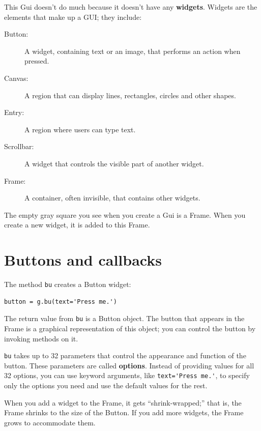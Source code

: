 \documentclass[10pt]{book}
\begin{document}
\begin{CJK}{UTF8}{gbsn}
This Gui doesn't do much because it doesn't have any
{\bf widgets}.  Widgets are the elements that make up a
GUI; they include:

\begin{description}

\item[Button:] A widget, containing text or an image, that
performs an action when pressed.

\item[Canvas:] A region that can display lines, rectangles,
circles and other shapes.

\item[Entry:] A region where users can type text.

\item[Scrollbar:] A widget that controls the visible part of another
widget.

\item[Frame:] A container, often invisible, that contains other
widgets.

\end{description}

The empty gray square you see when you create a Gui is
a Frame.  When you create a new widget, it is added to this Frame.



\section{Buttons and callbacks}

The method {\tt bu} creates a Button widget:

\begin{verbatim}
button = g.bu(text='Press me.')
\end{verbatim}
%
The return value from {\tt bu} is a Button object.  The button
that appears in the Frame is a graphical representation of this
object; you can control the button by invoking methods on it.

{\tt bu} takes up to 32 parameters that control the appearance
and function of the button.  These parameters are called
{\bf options}.  Instead of providing values for all 32 options,
you can use keyword arguments, like \verb"text='Press me.'",
to specify only the options you need and use the default
values for the rest.

When you add a widget to the Frame, it gets ``shrink-wrapped;''
that is, the Frame shrinks to the size of the Button.  If you
add more widgets, the Frame grows to accommodate them.


\end{CJK}
\end{document}
